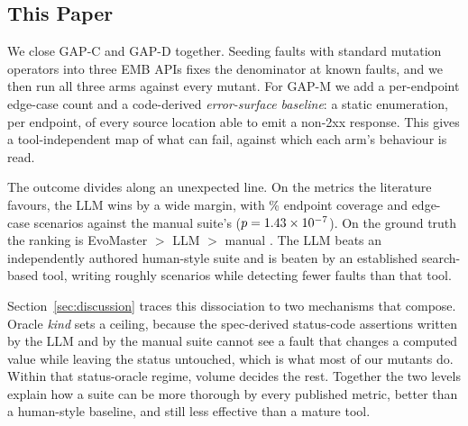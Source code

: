 \subsection{This Paper}
We close GAP-C and GAP-D together. Seeding faults with standard mutation operators into three
EMB APIs fixes the denominator at \RQIIn{} known faults, and we then run all three arms
against every mutant. For GAP-M we add a per-endpoint edge-case count and a code-derived
\emph{error-surface baseline}: a static enumeration, per endpoint, of every source location
able to emit a non-2xx response. This gives a tool-independent map of what can fail, against
which each arm's behaviour is read.

The outcome divides along an unexpected line. On the metrics the literature favours, the LLM
wins by a wide margin, with \RQIcoveragePct\% endpoint coverage and \RQIIItotalLlm{} edge-case
scenarios against the manual suite's \RQIIItotalManual{} ($p=1.43\times10^{-7}$). On the ground
truth the ranking is EvoMaster \RQIIrecallEvo{} $>$ LLM \RQIIrecallLlm{} $>$ manual
\RQIIrecallManual{}. The LLM beats an independently authored human-style suite and is beaten
by an established search-based tool, writing roughly \RQIIItotalLlm{} scenarios while
detecting fewer faults than that tool.

Section~\ref{sec:discussion} traces this dissociation to two mechanisms that compose. Oracle
\emph{kind} sets a ceiling, because the spec-derived status-code assertions written by the LLM
and by the manual suite cannot see a fault that changes a computed value while leaving the
status untouched, which is what most of our mutants do. Within that status-oracle regime,
volume decides the rest. Together the two levels explain how a suite can be more thorough by
every published metric, better than a human-style baseline, and still less effective than a
mature tool.

